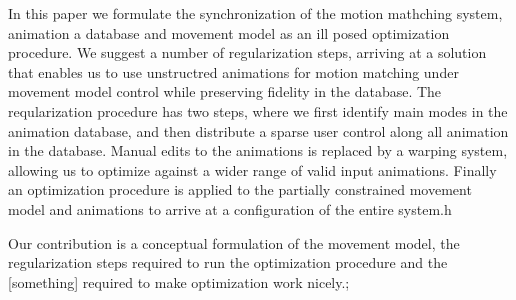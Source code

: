 In this paper we formulate the synchronization of the motion mathching system, animation a database and movement model as an ill posed optimization procedure. We suggest a number of regularization steps, arriving at a solution that enables us to use unstructred animations for motion matching under movement model control while preserving fidelity in the database. The reqularization procedure has two steps, where we first identify main modes in the animation database, and then distribute a sparse user control along all animation in the database. Manual edits to the animations is replaced by a warping system, allowing us to optimize against a wider range of valid input animations. Finally an optimization procedure is applied to the partially constrained movement model and animations to arrive at a configuration of the entire system.h   

Our contribution is a conceptual formulation of the movement model, the regularization steps required to run the optimization procedure and the [something] required to make optimization work nicely.;

